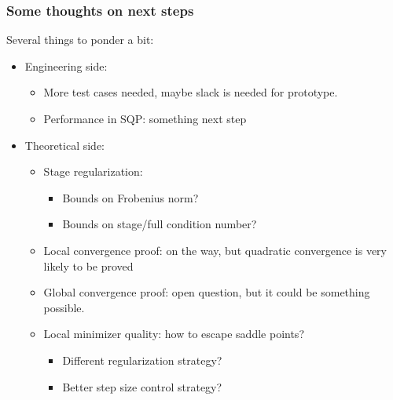 \documentclass[10pt,aspectratio=1610]{beamer} %
\begin{document}
\begin{frame}
    \frametitle{Some thoughts on next steps}
    Several things to ponder a bit:
    \begin{itemize}
        \item Engineering side:
        \begin{itemize}
            \item More test cases needed, maybe slack is needed for prototype.
            \item Performance in SQP: something next step
        \end{itemize}
        \item Theoretical side:
        \begin{itemize}
            \item Stage regularization:
            \begin{itemize}
            \item Bounds on Frobenius norm?
            \item Bounds on stage/full condition number?
            \end{itemize} 
            \item Local convergence proof: on the way, but quadratic convergence is very likely to be proved
            \item Global convergence proof: open question, but it could be something possible.
            \item Local minimizer quality: how to escape saddle points?
            \begin{itemize}
            \item Different regularization strategy?
            \item Better step size control strategy?
            \end{itemize}
        \end{itemize}
    \end{itemize}
\end{frame}




\end{document}
